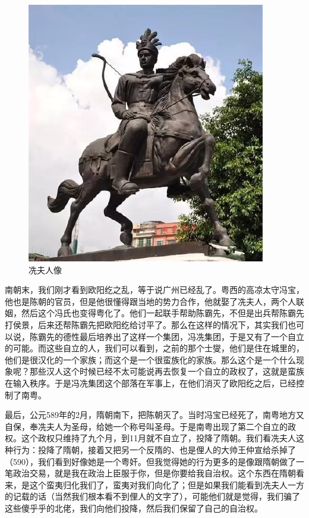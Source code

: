 \begin{figure}
	\centering
	\includegraphics[width=\textwidth]{images/image-22}
	\caption{冼夫人像}
\end{figure}

南朝末，我们刚才看到欧阳纥之乱，等于说广州已经乱了。粤西的高凉太守冯宝，他也是陈朝的官员，但是他很懂得跟当地的势力合作，他就娶了冼夫人，两个人联姻，然后这个冯氏也变得粤化了。他们一起联手帮助陈霸先，不但是出兵帮陈霸先打侯景，后来还帮陈霸先把欧阳纥给讨平了。那么在这样的情况下，其实我们也可以说，陈霸先的德性最后培养出了这样一个集团，冯冼集团，于是又有了一个自立的可能。而这些自立的人，我们可以看到，之前的那个士燮，他们是住在城里的，他们是很汉化的一个家族；而这个是一个很蛮族化的家族。那么这个是一个什么现象呢？那些汉人这个时候已经不太可能说再去恢复一个自立的政权了，这就是蛮族在输入秩序。于是冯冼集团这个部落在军事上，在他们消灭了欧阳纥之后，已经控制了南粤。

最后，公元589年的2月，隋朝南下，把陈朝灭了。当时冯宝已经死了，南粤地方又自保，奉冼夫人为圣母，给她一个称号叫圣母。于是南粤出现了第二个自立的政权。这个政权只维持了九个月，到11月就不自立了，投降了隋朝。我们看冼夫人这种行为：投降了隋朝，接着又把另一个反隋的、也是俚人的大帅王仲宣给杀掉了（590），我们看到好像她是一个粤奸。但我觉得她的行为更多的是像跟隋朝做了一笔政治交易，就是我在政治上臣服于你，但是你要给我自治权。这个东西在隋朝看来，是这个蛮夷归化我们了，蛮夷对我们向化了；但是如果我们能看到冼夫人一方的记载的话（当然我们根本看不到俚人的文字了），可能他们就是觉得，我们骗了这些傻乎乎的北佬，我们向他们投降，然后我们保留了自己的自治权。

